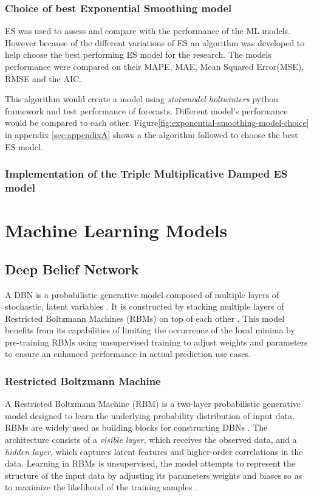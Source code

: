  \subsubsection{Choice of best Exponential Smoothing model}
 ES was used to assess and compare with the performance of the ML models. However because of the different variations of ES an algorithm was  developed to help choose the best performing ES model for the research. The models performance were compared on their MAPE, MAE, Mean Squared Error(MSE), RMSE and the AIC.
 
 This algorithm would create a model using \textit{statsmodel holtwinters} python framework \cite{statsmodels_expsmoothing_doc} and test  performance of forecasts. Different model's performance would be compared to each other. Figure\ref{fig:exponential-smoothing-model-choice} in appendix \ref{sec:appendixA} shows a the algorithm followed to choose the best ES model. 
\subsubsection{Implementation of the Triple Multiplicative Damped ES model}

\section{Machine Learning Models}

\subsection{Deep Belief Network}
 
 A DBN is a probabilistic generative model composed of multiple layers of stochastic, latent variables \cite{zhang2017deep}. It is constructed by stacking multiple layers of Restricted Boltzmann Machines (RBMs) on top of each other \cite{zhang2016short}. This model benefits from its capabilities of limiting the occurrence of the local minima by pre-training RBMs using unsupervised training to adjust weights and parameters to ensure an enhanced performance in actual prediction use cases.
 
\subsubsection{Restricted Boltzmann Machine}

A Restricted Boltzmann Machine (RBM) is a two-layer probabilistic generative model designed to learn the underlying probability distribution of input data. RBMs are widely used as building blocks for constructing DBNs \cite{dong2021short}. The architecture consists of a \textit{visible layer}, which receives the observed data, and a \textit{hidden layer}, which captures latent features and higher-order correlations in the data. Learning in RBMs is unsupervised, the model attempts to represent the structure of the input data by adjusting its parameters weights and biases so as to maximize the likelihood of the training samples \cite{zhang2017deep}.

